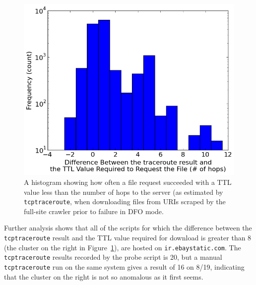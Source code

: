 \begin{figure}
	\includegraphics[width=\columnwidth]{figures/histfull-mod}
	\caption{
		A histogram showing how often a file request succeeded with a TTL value less than the number of hops to the server (as estimated by \texttt{tcptraceroute}, when downloading files from URIs scraped by the full-site crawler prior to failure in DFO mode.
	}
	\label{fig_histfull-mod}
\end{figure}
Further analysis shows that all of the scripts for which the difference between the \texttt{tcptraceroute} result and the TTL value required for download is greater than 8 (the cluster on the right in Figure~\ref{fig_histfull-mod}), are hosted on \texttt{ir.ebaystatic.com}.
The \texttt{tcptraceroute} results recorded by the probe script is 20, but a manual \texttt{tcptraceroute} run on the same system gives a result of 16 on 8/19, indicating that the cluster on the right is not so anomalous as it first seems.